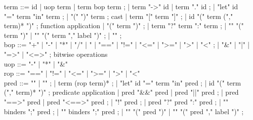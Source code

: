 \begin{syntax}
  term ::= id | uop term | term bop term ;  
       | term "->" id | term "." id  ;
       | "let" id "=" term "in" term ;
       | "(" \tau ")" term  ; cast 
       | term "[" term "]" ;
       | id "(" term ("," term)* ")" ; function application
       | "(" term ")" ;
       | term "?" term ":" term ;
       | "\old" "(" term ")" | "\at" "(" term "," label ")" ;
       | "\result" ;
       \\
  bop ::= "+" | "-" | "*" | "/" | "%
       | "==" | "!=" | "<=" | ">=" | ">" | "<" ;
       | "&" | "|" | "=>" | "<=>" ; bitwise operations 
       \\
  uop ::= "-" | "*" | "&" \\
  rop ::= "==" | "!=" | "<=" | ">=" | ">" | "<" \\
  pred ::= "\true" | "\false" ;
       | term (rop term)* ;
       | "let" id "=" term "in" pred ;
       | id "(" term ("," term)* ")" ; predicate application
       | pred "&&" pred | pred "||" pred ;
       | pred "==>" pred | pred "<==>" pred ;
       | "!" pred ;
       | pred "?" pred ":" pred ;
       | "\forall" binders ";" pred ;
       | "\exists" binders ";" pred ;
       | "\old" "(" pred ")" | "\at" "(" pred "," label ")" ;
\end{syntax}

